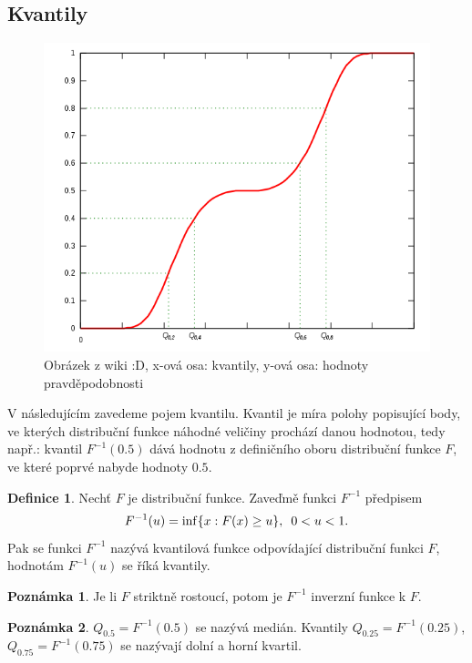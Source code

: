 \documentclass[a4]{report}
\theoremstyle{definition}
\newtheorem{definition}{Definice}[section]
\newtheorem{remark}{Poznámka}[section]
\begin{document}
{\subsection{Kvantily}
\begin{figure}[h]
\begin{center}
\includegraphics[scale=0.5]{600px-Quantile.png}
\caption{Obrázek z wiki :D, x-ová osa: kvantily, y-ová osa: hodnoty pravděpodobnosti}
\end{center}
\end{figure}
V následujícím zavedeme pojem kvantilu. Kvantil je míra polohy popisující body, ve kterých distribuční funkce náhodné veličiny prochází danou hodnotou, tedy např.: kvantil $F^{-1}(0.5)$ dává hodnotu z definičního oboru distribuční funkce $F$, ve které poprvé nabyde hodnoty $0.5$.
\begin{definition}
Nechť $F$ je distribuční funkce. Zaveďmě funkci $F^{-1}$ předpisem
\begin{equation}
F^{-1}(u) = \inf\lbrace x : F(x) \geq u \rbrace, \enskip 0 < u < 1.
\end{equation}
Pak se funkci $F^{-1}$ nazývá kvantilová funkce odpovídající distribuční funkci $F$, hodnotám $F^{-1}(u)$ se říká kvantily.
\end{definition}

\begin{remark}
Je li $F$ striktně rostoucí, potom je $F^{-1}$ inverzní funkce k $F$.
\end{remark}

\begin{remark}
$Q_{0.5} = F^{-1}(0.5)$ se nazývá medián. Kvantily $Q_{0.25} = F^{-1}(0.25)$, $Q_{0.75} = F^{-1}(0.75)$ se nazývají dolní a horní kvartil.
\end{remark}
}
\end{document}

